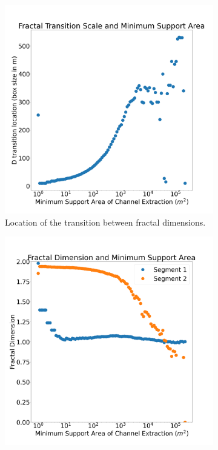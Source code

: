 \documentclass[final]{beamer}
\newlength{\colwidth}
\begin{document}
\begin{frame}[t]
\begin{columns}[t]
\begin{column}{\colwidth}
  \begin{figure}
  \begin{subfigure}{.45\textwidth}
       \centering
      \includegraphics[width=\textwidth]{transition_and_area.png}
      \caption{Location of the transition between fractal dimensions.}%
      \label{fig:transition_area}
    \end{subfigure}
    \begin{subfigure}{.45\textwidth}
            \centering
      \includegraphics[width=\textwidth]{D_and_area.png}

\end{subfigure}
\end{figure}
\end{column}
\end{columns}
\end{frame}
\end{document}
